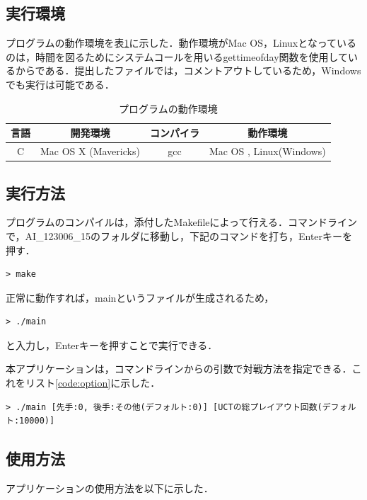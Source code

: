 \documentclass{jarticle}
\begin{document}
\subsection{実行環境}
プログラムの動作環境を表\ref{fig:spec}に示した．動作環境がMac OS，Linuxとなっているのは，時間を図るためにシステムコールを用いるgettimeofday関数を使用しているからである．提出したファイルでは，コメントアウトしているため，Windowsでも実行は可能である．
\begin{table}[htdp]
	\caption{プログラムの動作環境}
	\begin{center}
		\begin{tabular}{|c|c|c|c|} \hline 
			言語 & 開発環境 & コンパイラ & 動作環境 \\ \hline \hline 
			C & Mac OS X (Mavericks) & gcc & Mac OS , Linux(Windows) \\ \hline 
		\end{tabular}
	\end{center}
	\label{fig:spec}
\end{table}


\subsection{実行方法}
プログラムのコンパイルは，添付したMakefileによって行える．コマンドラインで，AI\_123006\_15のフォルダに移動し，下記のコマンドを打ち，Enterキーを押す．
\lstset{style=customplain}
\begin{lstlisting}[caption={make},label=code:make]
> make
\end{lstlisting}
正常に動作すれば，mainというファイルが生成されるため，
\begin{lstlisting}[caption={実行},label=code:execute]
> ./main
\end{lstlisting}
と入力し，Enterキーを押すことで実行できる．

本アプリケーションは，コマンドラインからの引数で対戦方法を指定できる．これをリスト\ref{code:option}に示した．
\begin{lstlisting}[caption={実行},label=code:option]
> ./main [先手:0, 後手:その他(デフォルト:0)] [UCTの総プレイアウト回数(デフォルト:10000)]
\end{lstlisting}




\subsection{使用方法}
アプリケーションの使用方法を以下に示した．
\end{document}
